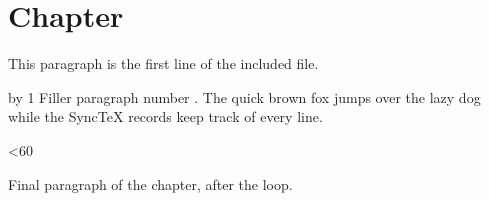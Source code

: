 \section{Chapter}
\label{sec:chapter}
This paragraph is the first line of the included file.

\newcount\fillerCount
{}
\loop
  \advance\fillerCount by 1
  Filler paragraph number \the\fillerCount. The quick brown fox jumps over the lazy dog
  while the SyncTeX records keep track of every line.\par
  \ifnum\fillerCount<60
\repeat

Final paragraph of the chapter, after the loop.

